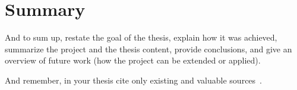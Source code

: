 
\chapter{Summary}

And to sum up, restate the goal of the thesis, explain how it was achieved, summarize the project and the thesis content, provide conclusions, and give an overview of future work (how the project can be extended or applied).

And remember, in your thesis cite only existing and valuable sources~\cite{ward2017celebrity}.
